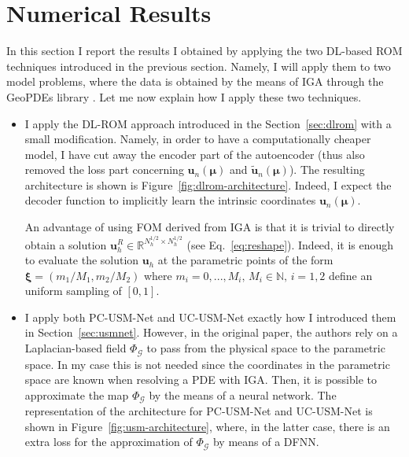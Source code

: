 \documentclass[11pt]{article}
\begin{document}
\section{Numerical Results}\label{sec:numericres}
In this section I report the results I obtained by applying the two DL-based ROM techniques introduced in the previous section. Namely, I will apply them to two model problems, where the data is obtained by the means of IGA through the GeoPDEs library \cite{vazquez2016new}. Let me now explain how I apply these two techniques.
\begin{itemize}
\item I apply the DL-ROM approach introduced in the Section~\ref{sec:dlrom} with a small modification. Namely, in order to have a computationally cheaper model, I have cut away the encoder part of the autoencoder (thus also removed the loss part concerning $\mathbf u_n(\boldsymbol\mu)$ and $\tilde{\mathbf u}_n(\boldsymbol\mu)$). The resulting architecture is shown is Figure~\ref{fig:dlrom-architecture}. Indeed, I expect the decoder function to implicitly learn the intrinsic coordinates $\mathbf u_n(\boldsymbol\mu)$. 

An advantage of using FOM derived from IGA is that it is trivial to directly obtain a solution $\mathbf u_h^R \in \mathbb R^{N_h^{1/2}\times N_h^{1/2}}$ (see Eq.~\ref{eq:reshape}). Indeed, it is enough to evaluate the solution $\mathbf u_h$ at the parametric points of the form $\boldsymbol \xi = (m_1/M_1, m_2/M_2)$ where $m_i = 0, ..., M_i, \, M_i \in \mathbb N, \, i=1,2$ define an uniform sampling of $[0, 1]$.
\item I apply both PC-USM-Net and UC-USM-Net exactly how I introduced them in Section~\ref{sec:usmnet}. However, in the original paper, the authors rely on
a Laplacian-based field $\Phi_{\mathcal G}$ to pass from the physical space to the parametric space. In my case this is not needed since the coordinates in the parametric space are known when resolving a PDE with IGA. Then, it is possible to approximate the map $\Phi_{\mathcal G}$ by the means of a neural network. The representation of the architecture for PC-USM-Net and UC-USM-Net is shown in Figure~\ref{fig:usm-architecture}, where, in the latter case, there is an extra loss for the approximation of $\Phi_{\mathcal G}$ by means of a DFNN. 
\end{itemize}
\end{document}
